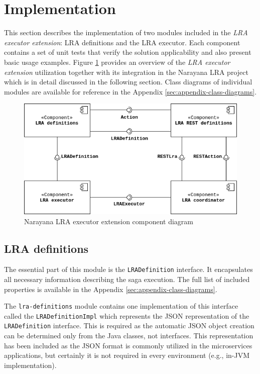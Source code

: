 \documentclass[oneside,
  digital, %
  table,   %
  lof,     %
  lot,     %
]{fithesis3}
\begin{document}
\section{Implementation}

This section describes the implementation of two modules included in the \textit{LRA executor extension}: LRA definitions and the LRA executor. Each component contains a set of unit tests that verify the solution applicability and also present basic usage examples. Figure \ref{fig:integration-component} provides an overview of the \textit{LRA executor extension} utilization together with its integration in the Narayana LRA project which is in detail discussed in the following section. Class diagrams of individual modules are available for reference in the Appendix \ref{sec:appendix-class-diagrams}.

\hfill \break

\begin{figure}[h]
    \begin{center}
        \includegraphics[width=1.0\textwidth]{images/componentDiagrams/narayana-integration-component.png}
    \end{center}
    \caption{Narayana LRA executor extension component diagram}
    \label{fig:integration-component}
\end{figure}


\subsection{LRA definitions}

The essential part of this module is the \texttt{LRADefinition} interface. It encapsulates all necessary information describing the saga execution. The full list of included properties is available in the Appendix \ref{sec:appendix-class-diagrams}. 

The \texttt{lra-definitions} module contains one implementation of this interface called the \texttt{LRADefinitionImpl} which represents the JSON representation of the \texttt{LRADefinition} interface. This is required as the automatic JSON object creation can be determined only from the Java classes, not interfaces. This representation has been included as the JSON format is commonly utilized in the microservices applications, but certainly it is not required in every environment (e.g., in-JVM implementation).
\end{document}
